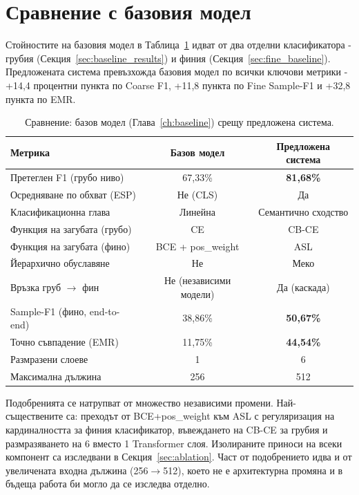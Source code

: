 \documentclass[12pt,a4paper]{report}
\begin{document}
\section{Сравнение с базовия модел}

Стойностите на базовия модел в Таблица~\ref{tab:baseline_vs_advanced} идват от два отделни класификатора - грубия (Секция~\ref{sec:baseline_results}) и финия (Секция~\ref{sec:fine_baseline}). Предложената система превъзхожда базовия модел по всички ключови метрики - +14,4 процентни пункта по Coarse F1, +11,8 пункта по Fine Sample-F1 и +32,8 пункта по EMR.

\begin{table}[H]
\centering
\caption{Сравнение: базов модел (Глава~\ref{ch:baseline}) срещу предложена система.}
\label{tab:baseline_vs_advanced}
\begin{tabular}{lcc}
\toprule
\textbf{Метрика} & \textbf{Базов модел} & \textbf{Предложена система} \\
\midrule
Претеглен F1 (грубо ниво) & 67,33\% & \textbf{81,68\%} \\
Осредняване по обхват (ESP) & Не (CLS) & Да \\
Класификационна глава & Линейна & Семантично сходство \\
Функция на загубата (грубо) & CE & CB-CE \\
Функция на загубата (фино) & BCE + pos\_weight & ASL \\
Йерархично обуславяне & Не & Меко \\
Връзка груб $\to$ фин & Не (независими модели) & Да (каскада) \\
Sample-F1 (фино, end-to-end) & 38,86\% & \textbf{50,67\%} \\
Точно съвпадение (EMR) & 11,75\% & \textbf{44,54\%} \\
Размразени слоеве & 1 & 6 \\
Максимална дължина & 256 & 512 \\
\bottomrule
\end{tabular}
\end{table}

Подобренията се натрупват от множество независими промени. Най-съществените са: преходът от BCE+pos\_weight към ASL с регуляризация на кардиналността за финия класификатор, въвеждането на CB-CE за грубия и размразяването на 6 вместо 1 Transformer слоя. Изолираните приноси на всеки компонент са изследвани в Секция~\ref{sec:ablation}. Част от подобрението идва и от увеличената входна дължина (256$\to$512), което не е архитектурна промяна и в бъдеща работа би могло да се изследва отделно.
\end{document}
